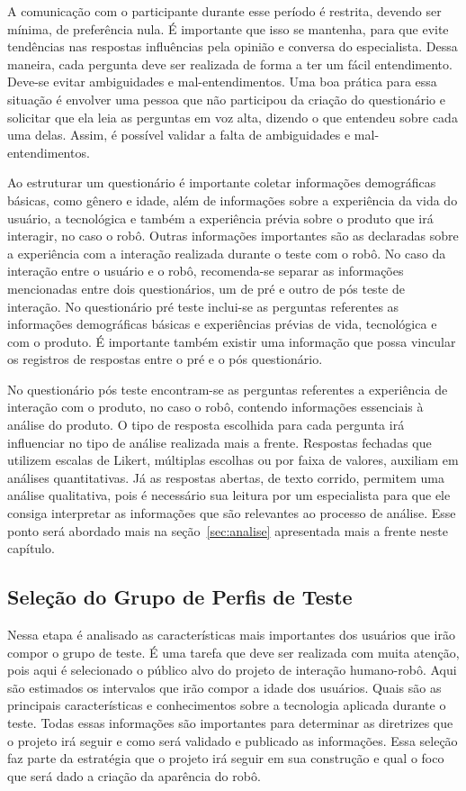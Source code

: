 A comunicação com o participante durante esse período é restrita, devendo ser mínima, de preferência nula. É importante que isso se mantenha, para que evite tendências nas respostas influências pela opinião e conversa do especialista. Dessa maneira, cada pergunta deve ser realizada de forma a ter um fácil entendimento. Deve-se evitar ambiguidades e mal-entendimentos. Uma boa prática para essa situação é envolver uma pessoa que não participou da criação do questionário e solicitar que ela leia as perguntas em voz alta, dizendo o que entendeu sobre cada uma delas. Assim, é possível validar a falta de ambiguidades e mal-entendimentos.

Ao estruturar um questionário é importante coletar informações demográficas básicas, como gênero e idade, além de informações sobre a experiência da vida do usuário, a tecnológica e também a experiência prévia sobre o produto que irá interagir, no caso o robô. Outras informações importantes são as declaradas sobre a experiência com a interação realizada durante o teste com o robô. No caso da interação entre o usuário e o robô, recomenda-se separar as informações mencionadas entre dois questionários, um de pré e outro de pós teste de interação. No questionário pré teste inclui-se as perguntas referentes as informações demográficas básicas e experiências prévias de vida, tecnológica e com o produto. É importante também existir uma informação que possa vincular os registros de respostas entre o pré e o pós questionário.

No questionário pós teste encontram-se as perguntas referentes a experiência de interação com o produto, no caso o robô, contendo informações essenciais à análise do produto. O tipo de resposta escolhida para cada pergunta irá influenciar no tipo de análise realizada mais a frente. Respostas fechadas que utilizem escalas de Likert, múltiplas escolhas ou por faixa de valores, auxiliam em análises quantitativas. Já as respostas abertas, de texto corrido, permitem uma análise qualitativa, pois é necessário sua leitura por um especialista para que ele consiga interpretar as informações que são relevantes ao processo de análise. Esse ponto será abordado mais na seção~\ref{sec:analise} apresentada mais a frente neste capítulo. 

\subsection{Seleção do Grupo de Perfis de Teste}
\label{sec:selecaoperfis}
Nessa etapa é analisado as características mais importantes dos usuários que irão compor o grupo de teste. É uma tarefa que deve ser realizada com muita atenção, pois aqui é selecionado o público alvo do projeto de interação humano-robô. Aqui são estimados os intervalos que irão compor a idade dos usuários. Quais são as principais características e conhecimentos sobre a tecnologia aplicada durante o teste. Todas essas informações são importantes para determinar as diretrizes que o projeto irá seguir e como será validado e publicado as informações. Essa seleção faz parte da estratégia que o projeto irá seguir em sua construção e qual o foco que será dado a criação da aparência do robô.

